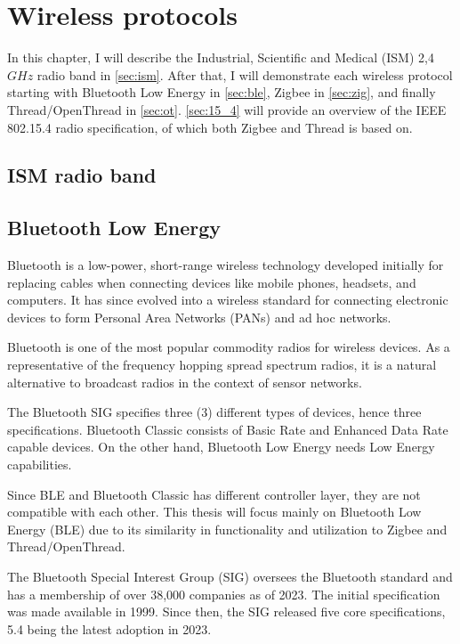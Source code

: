 \chapter{Wireless protocols}
\label{chap:wireless}

In this chapter, I will describe the Industrial, Scientific and Medical (ISM) 2,4 \(GHz\) radio band in \autoref{sec:ism}.
After that, I will demonstrate each wireless protocol starting with Bluetooth Low Energy in \autoref{sec:ble},
Zigbee in \autoref{sec:zig}, and finally Thread/OpenThread in \autoref{sec:ot}.
\autoref{sec:15_4} will provide an overview of the IEEE 802.15.4 radio specification, of which both Zigbee and Thread is based on.

\section{ISM radio band}
\label{sec:ism}

\section{Bluetooth Low Energy}
\label{sec:ble}

Bluetooth is a low-power, short-range wireless technology developed initially for replacing cables when connecting devices like mobile phones, headsets, and computers. It has since evolved into a wireless standard for connecting electronic devices to form Personal Area Networks (PANs) and ad hoc networks. \cite{Dideles03}

Bluetooth is one of the most popular commodity radios for wireless devices.
As a representative of the frequency hopping spread spectrum radios,
it is a natural alternative to broadcast radios in the context of sensor networks. \cite{Leopold03}

The Bluetooth SIG specifies three (3) different types of devices, hence three specifications.
Bluetooth Classic consists of Basic Rate and Enhanced Data Rate capable devices.
On the other hand, Bluetooth Low Energy needs Low Energy capabilities.

Since BLE and Bluetooth Classic has different controller layer, they are not compatible with each other.
This thesis will focus mainly on Bluetooth Low Energy (BLE) due to its
similarity in functionality and utilization to Zigbee and Thread/OpenThread.


The Bluetooth Special Interest Group (SIG) oversees
the Bluetooth standard and has a membership of over 38,000 companies as of 2023. \cite{bt_history}
The initial specification was made available in 1999.
Since then, the SIG released five core specifications, 5.4 being the latest adoption in 2023. \cite{bt_spec_history}

